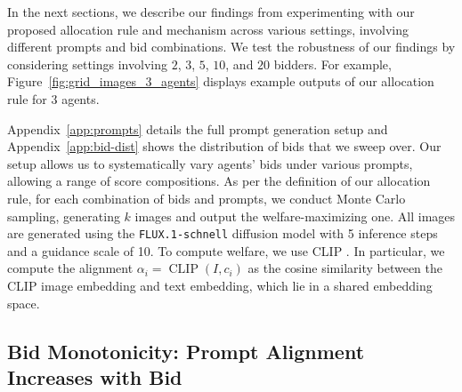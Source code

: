 \documentclass[format=acmsmall, review=false]{acmart}
\begin{document}
In the next sections, we describe our findings from experimenting with our proposed allocation rule and mechanism across various settings, involving different prompts and bid combinations. We test the robustness of our findings by considering settings involving $2$, $3$, $5$, $10$, and $20$ bidders.  For example,  Figure~\ref{fig:grid_images_3_agents} displays example outputs of our allocation rule for $3$ agents.

Appendix~\ref{app:prompts} details the full prompt generation setup and Appendix~\ref{app:bid-dist} shows the distribution of bids that we sweep over. Our setup allows us to systematically vary agents' bids under various prompts, allowing a range of score compositions. As per the definition of our allocation rule, for each combination of bids and prompts, we conduct Monte Carlo sampling, generating $k$ images and output the welfare-maximizing one. All images are generated using the \texttt{FLUX.1-schnell} diffusion model with 5 inference steps and a guidance scale of 10. To compute welfare, we use CLIP \citep{radford2021clip}. In particular, we compute the alignment $\alpha_i = \operatorname{CLIP}(I, c_i)$ as the cosine similarity between the CLIP image embedding and text embedding, which lie in a shared embedding space.



 




\subsection{Bid Monotonicity: Prompt Alignment Increases with Bid}
\label{sec:alignment-bid}

\end{document}
